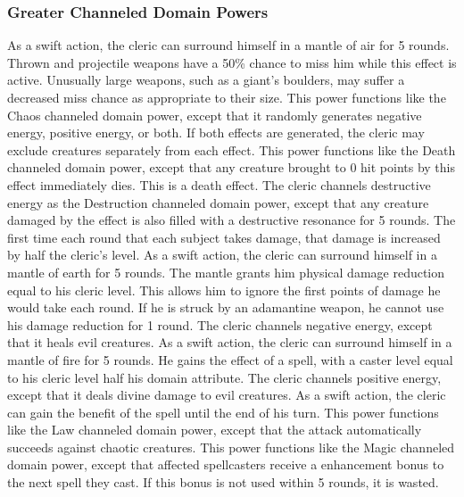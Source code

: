 \subsubsection{Greater Channeled Domain Powers}\label{Greater Channeled Domain Powers}

 As a swift action, the cleric can surround himself in a mantle of air for 5 rounds. Thrown and projectile weapons have a 50\% chance to miss him while this effect is active. Unusually large weapons, such as a giant's boulders, may suffer a decreased miss chance as appropriate to their size.
 This power functions like the Chaos channeled domain power, except that it randomly generates negative energy, positive energy, or both. If both effects are generated, the cleric may exclude creatures separately from each effect. 
 This power functions like the Death channeled domain power, except that any creature brought to 0 hit points by this effect immediately dies. This is a death effect.
 The cleric channels destructive energy as the Destruction channeled domain power, except that any creature damaged by the effect is also filled with a destructive resonance for 5 rounds. The first time each round that each subject takes damage, that damage is increased by half the cleric's level.
 As a swift action, the cleric can surround himself in a mantle of earth for 5 rounds. The mantle grants him physical damage reduction equal to his cleric level. This allows him to ignore the first points of damage he would take each round. If he is struck by an adamantine weapon, he cannot use his damage reduction for 1 round.
 The cleric channels negative energy, except that it heals evil creatures. 
 As a swift action, the cleric can surround himself in a mantle of fire for 5 rounds. He gains the effect of a  spell, with a caster level equal to his cleric level \add half his domain attribute.
 The cleric channels positive energy, except that it deals divine damage to evil creatures. 
 As a swift action, the cleric can gain the benefit of the  spell until the end of his turn.
 This power functions like the Law channeled domain power, except that the attack automatically succeeds against chaotic creatures.
 This power functions like the Magic channeled domain power, except that affected spellcasters receive a  enhancement bonus to the next spell they cast. If this bonus is not used within 5 rounds, it is wasted. 
